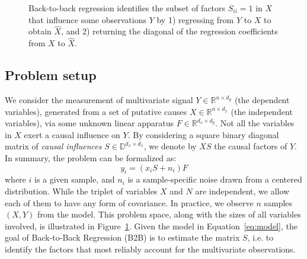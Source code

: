 \documentclass[preprint,12pt,3p]{elsarticle}
\begin{document}
\begin{figure}[t!]
  \caption{Back-to-back regression identifies the subset of factors $S_{ii} = 1$ in $X$ that influence some observations $Y$ by 1) regressing from $Y$ to $X$ to obtain $\hat{X}$, and 2) returning the diagonal of the regression coefficients from $X$ to $\hat{X}$.}
\label{fig:b2b}
\end{figure}

\subsection{Problem setup}

We consider the measurement of multivariate signal $Y \in \mathbb{R}^{n \times
d_y}$ (the dependent variables), generated from a set of putative causes $X \in \mathbb{R}^{n \times
d_x}$ (the independent variables), via some unknown linear apparatus $F \in \mathbb{R}^{d_x \times d_y}$.
%
Not all the variables in $X$ exert a causal influence on $Y$.
%
By considering a square binary diagonal matrix of \emph{causal influences} $S
\in \mathbb{D}^{d_x \times d_x}$, we denote by $XS$ the causal factors of $Y$.
%
In summary, the problem can be formalized as:
%
\begin{equation}
    y_i = (x_i S + n_i) F
    \label{eq:model}
\end{equation}
%
where $i$ is a given sample, and $n_i$ is a sample-specific noise drawn from a
centered distribution.
%
While the triplet of variables $X$ and $N$ are independent, we allow each of
them to have any form of covariance.
%
In practice, we observe $n$ samples $(X, Y)$ from the model.
%
This problem space, along with the sizes of all variables involved, is
illustrated in Figure~\ref{fig:b2b}.
%
Given the model in Equation~\cref{eq:model}, the goal of Back-to-Back
Regression (B2B) is to estimate the matrix $S$, i.e. to identify the factors
that most reliably account for the multivariate observations.
\end{document}
